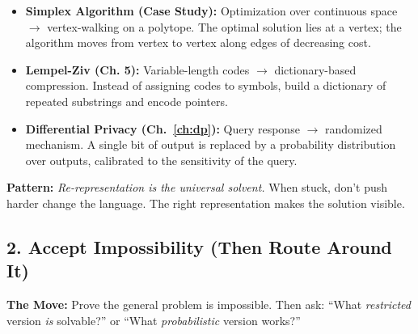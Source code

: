 \begin{itemize}
\item \textbf{Simplex Algorithm (Case Study):} Optimization over continuous space $\to$ vertex-walking on a polytope. The optimal solution lies at a vertex; the algorithm moves from vertex to vertex along edges of decreasing cost.

\item \textbf{Lempel-Ziv (Ch. 5):} Variable-length codes $\to$ dictionary-based compression. Instead of assigning codes to symbols, build a dictionary of repeated substrings and encode pointers.

\item \textbf{Differential Privacy (Ch.~\ref{ch:dp}):} Query response $\to$ randomized mechanism. A single bit of output is replaced by a probability distribution over outputs, calibrated to the sensitivity of the query.
\end{itemize}

\textbf{Pattern:} \emph{Re-representation is the universal solvent.} When stuck, don't push harder change the language. The right representation makes the solution visible.
\subsection{2. Accept Impossibility (Then Route Around It)}
\label{sec:anatomy:impossible:route}

\textbf{The Move:} Prove the general problem is impossible. Then ask: ``What \emph{restricted} version \emph{is} solvable?'' or ``What \emph{probabilistic} version works?''

